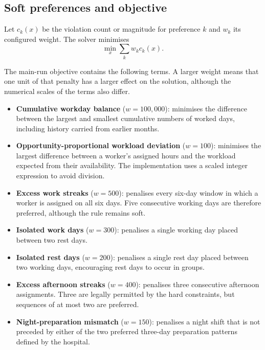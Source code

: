 \documentclass[11pt,a4paper]{article}
\begin{document}
\subsection{Soft preferences and objective}

Let $c_k(x)$ be the violation count or magnitude for preference $k$ and $w_k$ its configured weight. The solver minimises
\[
\min_x \sum_k w_k c_k(x).
\]

The main-run objective contains the following terms. A larger weight means that one unit of that penalty has a larger effect on the solution, although the numerical scales of the terms also differ.

\begin{itemize}
  \item \textbf{Cumulative workday balance} ($w=100{,}000$): minimises the difference between the largest and smallest cumulative numbers of worked days, including history carried from earlier months.

  \item \textbf{Opportunity-proportional workload deviation} ($w=100$): minimises the largest difference between a worker's assigned hours and the workload expected from their availability. The implementation uses a scaled integer expression to avoid division.

  \item \textbf{Excess work streaks} ($w=500$): penalises every six-day window in which a worker is assigned on all six days. Five consecutive working days are therefore preferred, although the rule remains soft.

  \item \textbf{Isolated work days} ($w=300$): penalises a single working day placed between two rest days.

  \item \textbf{Isolated rest days} ($w=200$): penalises a single rest day placed between two working days, encouraging rest days to occur in groups.

  \item \textbf{Excess afternoon streaks} ($w=400$): penalises three consecutive afternoon assignments. Three are legally permitted by the hard constraints, but sequences of at most two are preferred.

  \item \textbf{Night-preparation mismatch} ($w=150$): penalises a night shift that is not preceded by either of the two preferred three-day preparation patterns defined by the hospital.


\end{itemize}
\end{document}

